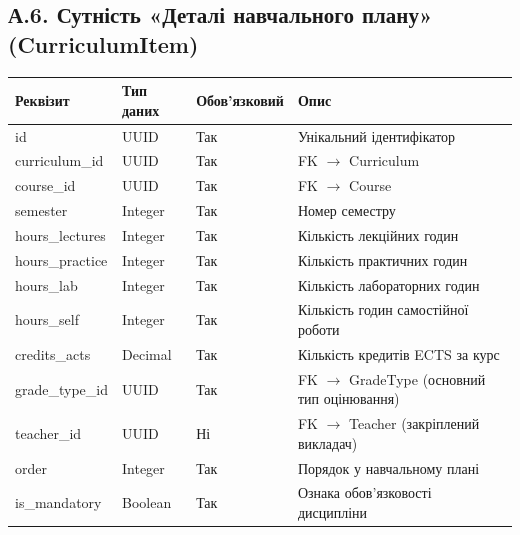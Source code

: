 \documentclass{article}
\begin{document}
\begin{appendix}
\subsection{А.6. Сутність «Деталі навчального плану» (CurriculumItem)}
\begin{longtable}{p{3.5cm}p{3cm}p{2.5cm}p{5cm}}
\toprule
\textbf{Реквізит} & \textbf{Тип даних} & \textbf{Обов'язковий} & \textbf{Опис} \\
\midrule
id & UUID & Так & Унікальний ідентифікатор \\
curriculum\_id & UUID & Так & FK $\rightarrow$ Curriculum \\
course\_id & UUID & Так & FK $\rightarrow$ Course \\
semester & Integer & Так & Номер семестру \\
hours\_lectures & Integer & Так & Кількість лекційних годин \\
hours\_practice & Integer & Так & Кількість практичних годин \\
hours\_lab & Integer & Так & Кількість лабораторних годин \\
hours\_self & Integer & Так & Кількість годин самостійної роботи \\
credits\_acts & Decimal & Так & Кількість кредитів ECTS за курс \\
grade\_type\_id & UUID & Так & FK $\rightarrow$ GradeType (основний тип оцінювання) \\
teacher\_id & UUID & Ні & FK $\rightarrow$ Teacher (закріплений викладач) \\
order & Integer & Так & Порядок у навчальному плані \\
is\_mandatory & Boolean & Так & Ознака обов'язковості дисципліни \\
\bottomrule
\end{longtable}


\end{appendix}
\end{document}
